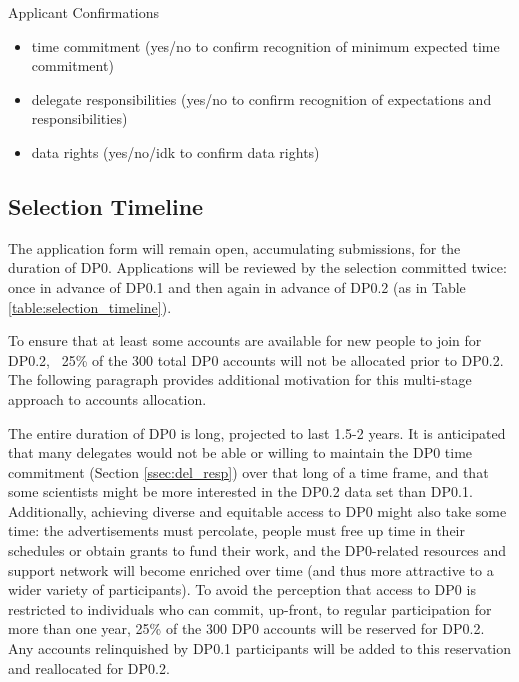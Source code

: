 \documentclass[DM,authoryear,toc]{lsstdoc}
\begin{document}
Applicant Confirmations
\begin{itemize}
\item time commitment (yes/no to confirm recognition of minimum expected time commitment)
\item delegate responsibilities (yes/no to confirm recognition of expectations and responsibilities)
\item data rights (yes/no/idk to confirm data rights)
\end{itemize}


\subsection{Selection Timeline}\label{ssec:sel_time}

The application form will remain open, accumulating submissions, for the duration of DP0.
Applications will be reviewed by the selection committed twice: once in advance of DP0.1 and then again in advance of DP0.2 (as in Table \ref{table:selection_timeline}).

To ensure that at least some accounts are available for new people to join for DP0.2, ~25\% of the 300 total DP0 accounts will not be allocated prior to DP0.2.
The following paragraph provides additional motivation for this multi-stage approach to accounts allocation.

The entire duration of DP0 is long, projected to last 1.5-2 years.
It is anticipated that many delegates would not be able or willing to maintain the DP0 time commitment (Section \ref{ssec:del_resp}) over that long of a time frame, and that some scientists might be more interested in the DP0.2 data set than DP0.1.
Additionally, achieving diverse and equitable access to DP0 might also take some time: the advertisements must percolate, people must free up time in their schedules or obtain grants to fund their work, and the DP0-related resources and support network will become enriched over time (and thus more attractive to a wider variety of participants).
To avoid the perception that access to DP0 is restricted to individuals who can commit, up-front, to regular participation for more than one year, 25\% of the 300 DP0 accounts will be reserved for DP0.2.
Any accounts relinquished by DP0.1 participants will be added to this reservation and reallocated for DP0.2.
\end{document}
